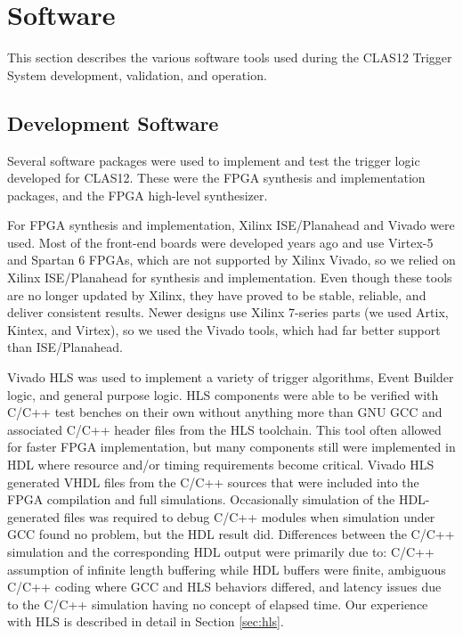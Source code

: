 \section{Software}

This section describes the various software tools used during the CLAS12 Trigger System development,
validation, and operation.

\subsection{Development Software}

Several software packages were used to implement and test the trigger logic developed for CLAS12. These
were the FPGA synthesis and implementation packages, and the FPGA high-level synthesizer.

For FPGA synthesis and implementation, Xilinx ISE/Planahead and Vivado were used. Most of the front-end
boards were developed years ago and use Virtex-5 and Spartan 6 FPGAs, which are not supported by Xilinx
Vivado, so we relied on Xilinx ISE/Planahead for synthesis and implementation. Even though these tools are no
longer updated by Xilinx, they have proved to be stable, reliable, and deliver consistent results. Newer designs
use Xilinx 7-series parts (we used Artix, Kintex, and Virtex), so we used the Vivado tools, which had far better
support than ISE/Planahead.

Vivado HLS was used to implement a variety of trigger algorithms, Event Builder logic, and general purpose
logic. HLS components were able to be verified with C/C++ test benches on their own without anything more
than GNU GCC and associated C/C++ header files from the HLS toolchain. This tool often allowed for faster
FPGA implementation, but many components still were implemented in HDL where resource and/or timing
requirements become critical. Vivado HLS generated VHDL files from the C/C++ sources that were included
into the FPGA compilation and full simulations. Occasionally simulation of the HDL-generated files was required
to debug C/C++ modules when simulation under GCC found no problem, but the HDL result did. Differences
between the C/C++ simulation and the corresponding HDL output were primarily due to: C/C++ assumption of
infinite length buffering while HDL buffers were finite, ambiguous C/C++ coding where GCC and HLS behaviors
differed, and latency issues due to the C/C++ simulation having no concept of elapsed time. Our experience with
HLS is described in detail in Section \ref{sec:hls}.

